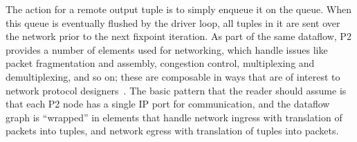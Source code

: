 The action for a remote output tuple is to simply enqueue it on the 
queue.  When this queue is eventually flushed by the driver loop, all tuples in
it are sent over the network prior to the next fixpoint iteration.  As part of
the same dataflow, P2 provides a number of elements used for networking, which
handle issues like packet fragmentation and assembly, congestion control,
multiplexing and demultiplexing, and so on; these are composable in ways that
are of interest to network protocol designers~\cite{condie-hotnets05}.  The
basic pattern that the reader should assume is that each P2 node has a single
IP port for communication, and the dataflow graph is ``wrapped'' in elements
that handle network ingress with translation of packets into tuples, and
network egress with translation of tuples into packets.


